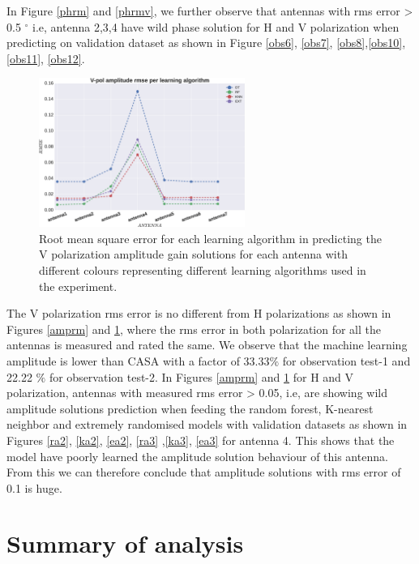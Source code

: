 In Figure \ref{phrm} and \ref{phrmv}, we further observe that antennas with rms error > 0.5 $^\circ$ i.e, antenna 2,3,4 have wild phase solution for H and V polarization when predicting on validation dataset as shown in Figure \ref{obs6}, \ref{obs7}, \ref{obs8},\ref{obs10}, \ref{obs11}, \ref{obs12}. 
\begin{figure}[H]
  \centering
    \includegraphics[width=0.6\textwidth]{images/Vpol-amp.eps}
    \caption{Root mean square error for each learning algorithm in predicting the V polarization amplitude gain solutions for each antenna with different colours representing different learning algorithms used in the experiment.}
  \label{amprmv}
 \end{figure} 

The V polarization rms error is no different from H polarizations as shown in Figures \ref{amprm} and \ref{amprmv}, where the rms error in both polarization for all the antennas is measured and rated the same. We observe that the machine learning amplitude is lower than CASA with a factor of 33.33$\%$ for observation test-1 and 22.22 $\%$ for observation test-2. In Figures \ref{amprm} and \ref{amprmv} for H and V polarization, antennas with measured rms error > 0.05, i.e, are showing wild amplitude solutions prediction when feeding the random forest, K-nearest neighbor and extremely randomised models with validation datasets as shown in Figures  \ref{ra2}, \ref{ka2}, \ref{ea2}, \ref{ra3} ,\ref{ka3}, \ref{ea3} for antenna 4. This shows that the model have poorly learned the amplitude solution behaviour of this antenna. From this we can therefore conclude that amplitude solutions with rms error of 0.1 is huge.

\section{Summary of analysis}

